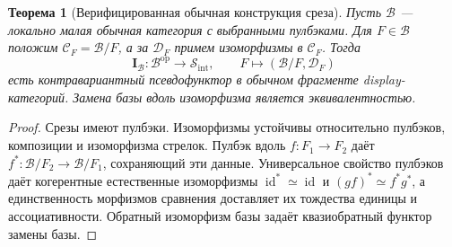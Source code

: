\documentclass[11pt]{article}
\theoremstyle{plain}
\newtheorem{theorem}{Теорема}[section]
\theoremstyle{definition}
\newcommand{\cS}{\mathcal{S}}
\newcommand{\cC}{\mathcal{C}}
\newcommand{\cD}{\mathcal{D}}
\newcommand{\Sint}{\cS_{\mathrm{int}}}
\newcommand{\II}{\mathbf{I}}
\DeclareMathOperator{\id}{id}
\begin{document}
\begin{theorem}[Верифицированная обычная конструкция среза]\label{thm:I-existence}
Пусть $\mathcal B$ — локально малая обычная категория с выбранными пулбэками. Для $F \in \mathcal B$ положим $\cC_F = \mathcal B / F$, а за $\cD_F$ примем изоморфизмы в $\cC_F$. Тогда
\[
 \II_{\mathcal B} : \mathcal B^{\mathrm{op}} \longrightarrow \Sint,
 \qquad F \longmapsto (\mathcal B / F, \cD_F)
\]
есть контравариантный псевдофунктор в обычном фрагменте display-категорий. Замена базы вдоль изоморфизма является эквивалентностью.
\end{theorem}
\begin{proof}
Срезы имеют пулбэки. Изоморфизмы устойчивы относительно пулбэков, композиции и изоморфизма стрелок. Пулбэк вдоль $f : F_1 \to F_2$ даёт $f^* : \mathcal B / F_2 \to \mathcal B / F_1$, сохраняющий эти данные. Универсальное свойство пулбэков даёт когерентные естественные изоморфизмы $\id^* \simeq \id$ и $(gf)^* \simeq f^* g^*$, а единственность морфизмов сравнения доставляет их тождества единицы и ассоциативности. Обратный изоморфизм базы задаёт квазиобратный функтор замены базы.
\end{proof}
\end{document}
